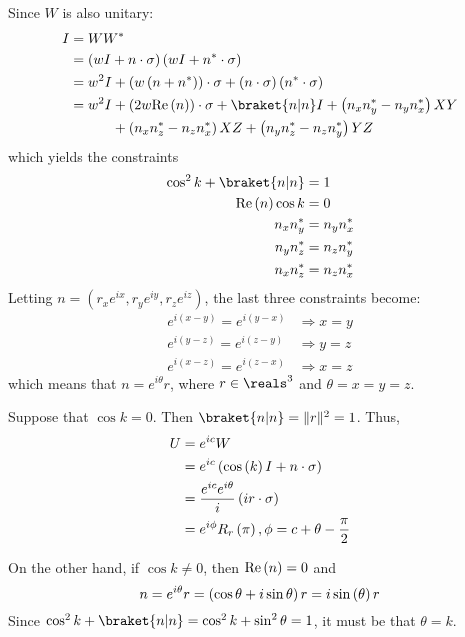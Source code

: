 \begin{enumerate}
%
Since $W$ is also unitary:
%
\begin{align}
I &= W W^* \\
&= \left( w I + n \cdot \sigma \right) \left( w I + n^* \cdot \sigma \right) \\
&= w^2 I + \left( w \left( n + n^* \right) \right) \cdot \sigma + \left( n \cdot \sigma \right) \left( n^* \cdot \sigma \right) \\
&= w^2 I + \left( 2 w \re{n} \right) \cdot \sigma + \braket{n|n} I +\left( n_x n_y^* - n_y n_x^* \right) XY \notag \\
&\phantom{{}= w^2 I} + \left( n_x n_z^* - n_z n_x^* \right) XZ + \left( n_y n_z^* - n_z n_y^* \right) YZ
\end{align}
%
which yields the constraints
%
\begin{align}
\cos^2 k + \braket{n|n} &= 1 \\
\re{n} \cos k &= 0 \\
n_x n_y^* &= n_y n_x^* \\
n_y n_z^* &= n_z n_y^* \\
n_x n_z^* &= n_z n_x^*
\end{align}
%
Letting $n = \left( r_x e^{ix}, r_y e^{iy}, r_z e^{iz} \right)$, the last three constraints become:
%
\begin{align}
e^{i \left( x - y \right)} = e^{i \left( y - x \right)} &\Rightarrow x = y \\
e^{i \left( y - z \right)} = e^{i \left( z - y \right)} &\Rightarrow y = z \\
e^{i \left( x - z \right)} = e^{i \left( z - x \right)} &\Rightarrow x = z
\end{align}
%
which means that $n = e^{i \theta} r$, where $r \in \reals^3$ and $\theta = x = y = z$.
%
\par Suppose that $\cos k = 0$.
%
Then $\braket{n|n} = \lVert r \rVert ^2 = 1$.
%
Thus,
%
\begin{align}
U &= e^{ic} W \\
&= e^{ic} \left( \cos \left( k \right) I + n \cdot \sigma \right) \\
&= \frac{e^{ic} e^{i \theta}}{i} \left( i r \cdot \sigma \right) \\
&= e^{i \phi} R_r \left( \pi \right), \phi = c + \theta - \frac{\pi}{2}
\end{align}
%
\par On the other hand, if $\cos k \ne 0$, then $\mathrm{Re} \left( n \right) = 0$ and
$$
n = e^{i \theta} r = \left( \cos \theta + i \sin \theta \right) r = i \sin \left( \theta \right) r
$$
%
Since $\cos^2 k + \braket{n|n} = \cos^2 k + \sin^2 \theta = 1$, it must be that $\theta = k$.

\end{enumerate}
